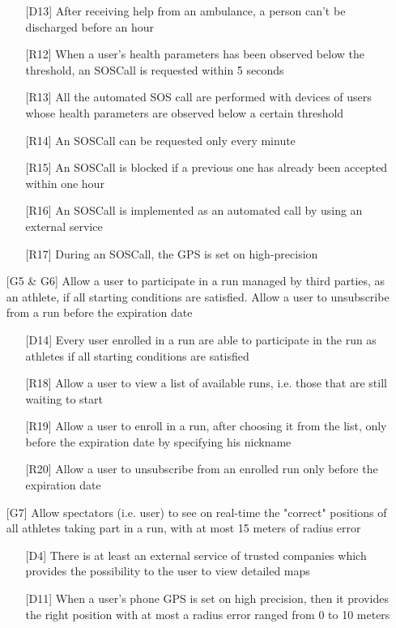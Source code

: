 \begin{itemize}
\begin{itemize}
	\item[{[D13]}] After receiving help from an ambulance, a person can't be discharged before an hour
	\item[{[R12]}] When a user's health parameters has been observed below the threshold, an SOSCall is requested within 5 seconds
	\item[{[R13]}] All the automated SOS call are performed with devices of users whose health parameters are observed below a certain threshold
	\item[{[R14]}] An SOSCall can be requested only every minute
	\item[{[R15]}] An SOSCall is blocked if a previous one has already been accepted within one hour
	\item[{[R16]}] An SOSCall is implemented as an automated call by using an external service
	\item[{[R17]}] During an SOSCall, the GPS is set on high-precision
	\end{itemize}
\item[{[G5 \& G6]}] Allow a user to participate in a run managed by third parties, as an athlete, if all starting conditions are satisfied. Allow a user to unsubscribe from a run before the expiration date
	\begin{itemize}
	\item[{[D14]}] Every user enrolled in a run are able to participate in the run as athletes if all starting conditions are satisfied
	\item[{[R18]}] Allow a user to view a list of available runs, i.e. those that are still waiting to start 
	\item[{[R19]}] Allow a user to enroll in a run, after choosing it from the list, only before the expiration date by specifying his nickname
	\item[{[R20]}] Allow a user to unsubscribe from an enrolled run only before the expiration date
	\end{itemize}
\item[{[G7]}] Allow spectators (i.e. user) to see on real-time the "correct" positions of all athletes taking part in a run, with at most 15 meters of radius error
	\begin{itemize}
	\item[{[D4]}] There is at least an external service of trusted companies which provides the possibility to the user to view detailed maps
	\item[{[D11]}] When a user's phone GPS is set on high precision, then it provides the right position with at most a radius error ranged from 0 to 10 meters

\end{itemize}
\end{itemize}
